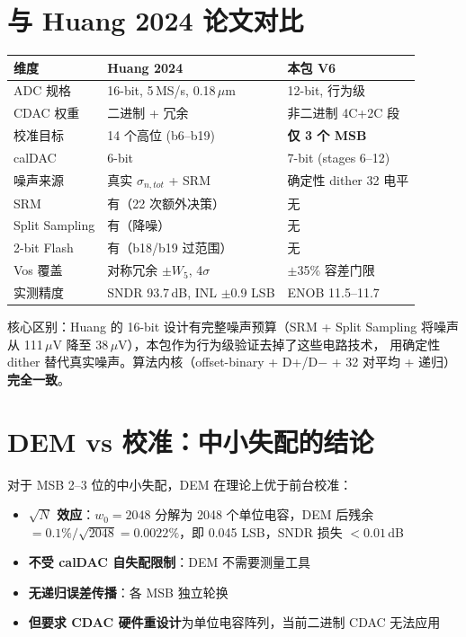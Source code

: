 \documentclass[UTF8,a4paper,11pt,twoside]{ctexrep}
\begin{document}
\section{与 Huang 2024 论文对比}

\begin{table}[ht]\centering\footnotesize
\begin{tabular}{p{2.5cm}p{4.5cm}p{5.0cm}}
\toprule
\textbf{维度} & \textbf{Huang 2024} & \textbf{本包 V6} \\
\hline
ADC 规格 & 16-bit, 5\,MS/s, 0.18\,$\mu$m & 12-bit, 行为级 \\
CDAC 权重 & 二进制 + 冗余 & 非二进制 4C+2C 段 \\
校准目标 & 14 个高位 (b6--b19) & \textbf{仅 3 个 MSB} \\
calDAC & 6-bit & 7-bit (stages 6--12) \\
噪声来源 & 真实 $\sigma_{n,tot}$ + SRM & 确定性 dither 32 电平 \\
SRM & 有（22 次额外决策） & 无 \\
Split Sampling & 有（降噪） & 无 \\
2-bit Flash & 有（b18/b19 过范围） & 无 \\
Vos 覆盖 & 对称冗余 $\pm W_5$, 4$\sigma$ & $\pm$35\% 容差门限 \\
实测精度 & SNDR 93.7\,dB, INL $\pm$0.9 LSB & ENOB 11.5--11.7 \\
\bottomrule
\end{tabular}
\end{table}

核心区别：Huang 的 16-bit 设计有完整噪声预算（SRM + Split Sampling 将噪声
从 111\,$\mu$V 降至 38\,$\mu$V），本包作为行为级验证去掉了这些电路技术，
用确定性 dither 替代真实噪声。算法内核（offset-binary + D+/D$-$ + 32 对平均
+ 递归）\textbf{完全一致}。

\section{DEM vs 校准：中小失配的结论}

对于 MSB 2--3 位的中小失配，DEM 在理论上优于前台校准：

\begin{itemize}
\item \textbf{$\sqrt{N}$ 效应}：$w_0=2048$ 分解为 2048 个单位电容，DEM 后残余
      $=0.1\%/\sqrt{2048}=0.0022\%$，即 0.045 LSB，SNDR 损失 $<0.01$\,dB
\item \textbf{不受 calDAC 自失配限制}：DEM 不需要测量工具
\item \textbf{无递归误差传播}：各 MSB 独立轮换
\item \textbf{但要求 CDAC 硬件重设计}为单位电容阵列，当前二进制 CDAC 无法应用
\end{itemize}
\end{document}
